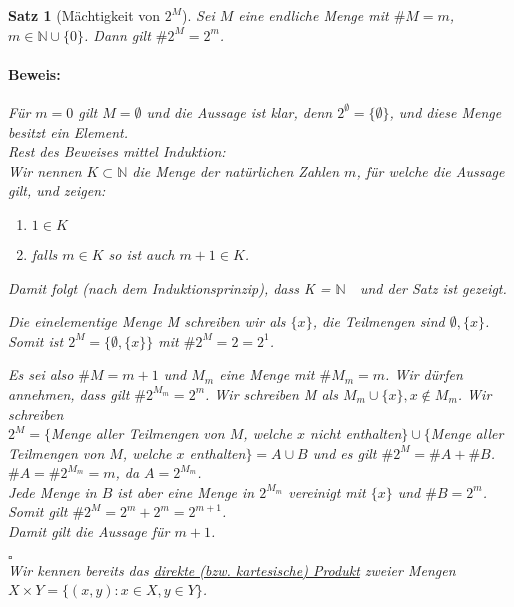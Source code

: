 \documentclass{report}
\newcommand{\N}{\mathbb{N}}
\newcommand{\mN}{$\mathbb{N}$\ }
\theoremstyle{customrem}
\theoremstyle{customdef}
\newtheorem{satz}[definition]{Satz}
\renewenvironment{proof}{\vspace{-.75cm}\paragraph{Beweis: }}{\vspace{-.5cm}\hfill$\square$}
\begin{document}
	\begin{satz}[Mächtigkeit von $2^M$]
		Sei $M$ eine endliche Menge mit $\#M = m$, $m \in \N \cup \{0\}$. Dann gilt $\#2^M = 2^m$.\\
		\begin{proof}
			Für $m = 0$ gilt $M = \emptyset$ und die Aussage ist klar, denn $2^\emptyset = \{\emptyset\}$, und diese Menge besitzt ein Element.\\
			Rest des Beweises mittel Induktion:\\
			Wir nennen $K \subset \N$ die Menge der natürlichen Zahlen $m$, für welche die Aussage gilt, und zeigen:
			\begin{enumerate}
				\itemsep0cm
				\item $1 \in K$
				\item falls $m \in K$ so ist auch $m + 1 \in K$.
			\end{enumerate}
			Damit folgt (nach dem Induktionsprinzip), dass  K = \mN\ und der Satz ist gezeigt.\\
			\begin{description}[labelindent = 12pt, labelwidth = 1.0cm, leftmargin = 1.0cm]
				\item[Zu 1.:] Die einelementige Menge M schreiben wir als $\{x\}$, die Teilmengen sind $\emptyset, \{x\}$. Somit ist $2^M = \{\emptyset, \{x\}\}$ mit $\#2^M = 2 = 2^1$.
				\item[Zu 2.:] Es sei also $\#M = m + 1$  und $M_m$ eine Menge mit $\# M_m = m$. Wir dürfen annehmen, dass gilt $\#2^{M_m} = 2^m$. Wir schreiben M als $M_m \cup \{x\}, x \not\in M_m$. Wir schreiben\\
				$2^M = \{$Menge aller Teilmengen von $M$, welche $x$ nicht enthalten$\} \cup \{$Menge aller Teilmengen von $M$, welche $x$ enthalten$\} = A \cup B$ und es gilt $\#2^M = \#A + \#B$.\\
				$\#A = \#2^{M_m} = m$, da $A = 2^{M_m}$.\\
				Jede Menge in $B$ ist aber eine Menge in $2^{M_m}$ vereinigt mit $\{x\}$ und $\#B = 2^m$. Somit gilt $\#2^M = 2^m + 2^m = 2^{m + 1}$.\\
				Damit gilt die Aussage für $m + 1$.
			\end{description}
		\end{proof}\\[.25cm]
		Wir kennen bereits das \hyperref[defmengenoperationen]{direkte (bzw. kartesische) Produkt} zweier Mengen $X \times Y = \{(x, y) : x\in X, y \in Y\}$.\\
	\end{satz}
\end{document}
